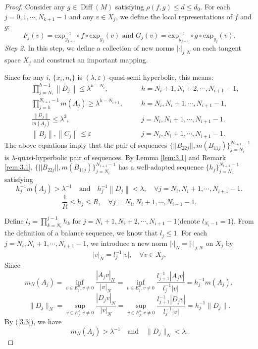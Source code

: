 \documentclass[12pt]{article}
\begin{document}
\begin{proof}
	Consider any $g \in \operatorname{Diff}(M)$ satisfying $ \rho(f,g)\leqslant d\leqslant d_0 $. For each $j=0,1,\cdots,N_{k+1}-1$ and any $v \in X_{j}$, we define the local representations of $ f $ and $ g $: 
	$$
	F_{j}(v)=\text{exp}_{y_{j+1}}^{-1}\circ f\circ \text{exp}_{y_{j}}(v)  \text{  and  } G_{j}(v)=\text{exp}_{y_{j+1}}^{-1}\circ g\circ \text{exp}_{y_{j}}(v). 
	$$
	{\em Step 2.} In this step, we define a collection of new norms $|\cdot|_{j,N} $ on each tangent space $X_{j}$ and construct an important mapping.
	
	Since for any $ i $, $ \{x_{i},n_{i}\} $ is $ (\lambda,\varepsilon) $-quasi-semi hyperbolic, this means:
	\begin{equation*}
		\begin{alignedat}{2}
			&\quad \prod_{j=N_{i}}^{h-1} \left\|D_{j}\right\|\leqslant \lambda^{h-N_{i}}, &&  \quad h=N_{i}+1,N_{i}+2,\cdots,N_{i+1}-1,  \\
			&\quad \prod_{j=h}^{N_{i+1}-1} m(A_{j})\geqslant \lambda^{h-N_{i+1}},&& \quad h=N_{i},N_{i}+1,\cdots,N_{i+1}-1,\\
			&\quad \frac{\left\|D_{j}\right\|}{m(A_{j})}\leqslant\lambda^{2},  && \quad j=N_{i},N_{i}+1,\cdots,N_{i+1}-1.\\
			&\quad \left\|B_{j}\right\|,\left\|C_{j}\right\|\leqslant \varepsilon && \quad j=N_{i},N_{i}+1,\cdots,N_{i+1}-1.
		\end{alignedat}
	\end{equation*}
	The above equations imply that the pair of sequences $\{||B_{22j}||,m(B_{11j})\}_{j= N_{i}}^{N_{i+1}-1}$ is $ \lambda $-quasi-hyperbolic pair of sequences. By Lemma \ref{lem:3.1} and Remark \ref{rem:3.1}, $\{||B_{22j}||,m(B_{11j})\}_{j= N_{i}}^{N_{i+1}-1}$ has a well-adapted sequence $\{h_{j}\}_{j= N_{i}}^{N_{i+1}-1} $ satisfying
	\begin{equation}\label{3.3}h_{j}^{-1}m(A_{j})>\lambda^{-1}\quad \text{and}\quad h_{j}^{-1}\left\|D_{j}\right\|<\lambda,\quad \forall j=N_{i},N_{i}+1,\cdots,N_{i+1}-1.
	\end{equation}
	\begin{equation}\label{3.4} \frac{1}{R}\leqslant h_{j}\leqslant R,\quad\forall j=N_{i},N_{i}+1,\cdots,N_{i+1}-1.
	\end{equation}
	
	Define $ l_{j}=\prod_{k=N_{i}}^{j-1}h_{k} $ for $ j=N_{i}+1,N_{i}+2,\cdots,N_{i+1}-1 $(denote $ l_{N_{i}-1}=1 $). From the definition of a balance sequence, we know that  $ l_{j}\leqslant 1 $.
	For each $j=N_{i},N_{i}+1,\cdots,N_{i+1}-1$, we introduce a new norm $|\cdot|_N = |\cdot|_{j,N}$ on $X_{j}$ by $$|v|_N = l_j^{-1} |v|, \quad \forall v \in X_{j}.$$
	Since $$m_N(A_{j}) = \inf_{v \in E^u_j, v \neq 0} \frac{|A_{j}v|_N}{|v|_N} = \inf_{v \in E^u_j, v \neq 0} \frac{l_{j+1}^{-1} |A_{j}v|}{l_j^{-1} |v|} = h_j^{-1} m(A_{j}),$$$$\|D_{j}\|_N = \sup_{v \in E^s_j, v \neq 0} \frac{|D_{j}v|_N}{|v|_N} = \sup_{v \in E^s_j, v \neq 0} \frac{l_{j+1}^{-1} |D_{j}v|}{l_j^{-1} |v|} = h_j^{-1} \|D_{j}\|.$$
	By (\ref{3.3}), we have
	\begin{equation}\label{3.5} m_{N}(A_{j}) > \lambda^{-1} \quad \text{and} \quad \|D_{j}\|_N< \lambda.
	\end{equation}
	

\end{proof}
\end{document}
